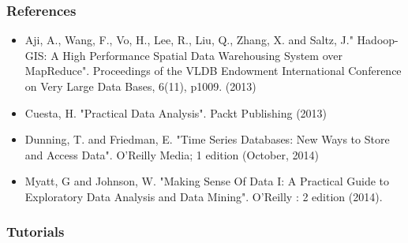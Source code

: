 \documentclass[hyperref={pdfpagelabels=true}]{beamer}
\begin{document}





\begin{frame}
\frametitle{References}
\begin{itemize}
\item Aji, A., Wang, F., Vo, H., Lee, R., Liu, Q., Zhang, X. and Saltz, J." Hadoop-GIS: A High Performance Spatial Data Warehousing System over MapReduce". Proceedings of the VLDB Endowment International Conference on Very Large Data Bases, 6(11), p1009. (2013)
\item Cuesta, H. "Practical Data Analysis". Packt Publishing (2013)
\item Dunning, T. and Friedman, E. "Time Series Databases: New Ways to Store and Access Data". O'Reilly Media; 1 edition (October, 2014)
\item Myatt, G and Johnson, W. "Making Sense Of Data I: A Practical Guide to Exploratory Data Analysis and Data Mining". O'Reilly : 2 edition (2014).

\end{itemize}
\end{frame}

\begin{frame}
\frametitle{Tutorials}
\end{frame}
\end{document}
